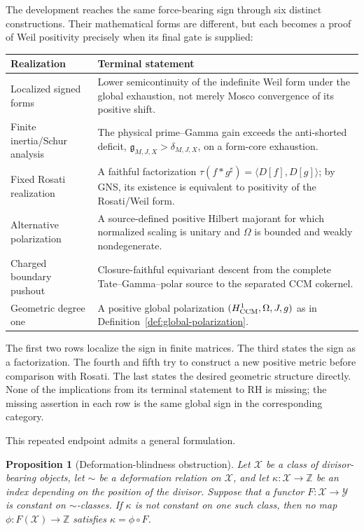 \documentclass[11pt]{amsart}
\newtheorem{proposition}[theorem]{Proposition}
\theoremstyle{definition}
\theoremstyle{remark}
\begin{document}
The development reaches the same force-bearing sign through six distinct
constructions.  Their mathematical forms are different, but each becomes
a proof of Weil positivity precisely when its final gate is supplied:
\begin{center}
\renewcommand{\arraystretch}{1.2}
\begin{tabular}{>{\raggedright\arraybackslash}p{}
                >{\raggedright\arraybackslash}p{}}
\toprule
Realization & Terminal statement\\
\midrule
Localized signed forms & Lower semicontinuity of the indefinite Weil form
under the global exhaustion, not merely Mosco convergence of its positive
shift.\\
Finite inertia/Schur analysis & The physical prime--Gamma gain exceeds the
anti-shorted deficit, \(\mathfrak g_{M,J,X}>\delta_{M,J,X}\), on a
form-core exhaustion.\\
Fixed Rosati realization & A faithful factorization
\(\tau(f*g^\sharp)=\langle D[f],D[g]\rangle\); by GNS, its existence is
equivalent to positivity of the Rosati/Weil form.\\
Alternative polarization & A source-defined positive Hilbert majorant for
which normalized scaling is unitary and \(\Omega\) is bounded and weakly
nondegenerate.\\
Charged boundary pushout & Closure-faithful equivariant descent from the
complete Tate--Gamma--polar source to the separated CCM cokernel.\\
Geometric degree one & A positive global polarization
\((H^1_{\rm CCM},\Omega,J,g)\) as in Definition~\ref{def:global-polarization}.\\
\bottomrule
\end{tabular}
\end{center}

The first two rows localize the sign in finite matrices.  The third states
the sign as a factorization.  The fourth and fifth try to construct a new
positive metric before comparison with Rosati.  The last states the desired
geometric structure directly.  None of the implications from its terminal
statement to RH is missing; the missing assertion in each row is the same
global sign in the corresponding category.

This repeated endpoint admits a general formulation.

\begin{proposition}[Deformation-blindness obstruction]
\label{prop:deformation-blindness}
Let \(\mathcal X\) be a class of divisor-bearing objects, let \(\sim\) be a
deformation relation on \(\mathcal X\), and let
\(\kappa:\mathcal X\to\mathbb Z\) be an index depending on the position of
the divisor.  Suppose that a functor \(F:\mathcal X\to\mathcal Y\) is
constant on \(\sim\)-classes.  If \(\kappa\) is not constant on one such
class, then no map \(\phi:F(\mathcal X)\to\mathbb Z\) satisfies
\(\kappa=\phi\circ F\).
\end{proposition}
\end{document}
